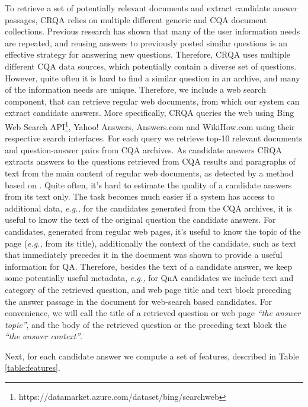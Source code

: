 \documentclass[letterpaper]{article}
\makeatletter
\newcommand{\eg}{\textit{e.g.,}\@\xspace}
\makeatother
\begin{document}
To retrieve a set of potentially relevant documents and extract candidate answer passages, CRQA relies on multiple different generic and CQA document collections.
Previous research \cite{shtok2012learning} has shown that many of the user information needs are repeated, and reusing answers to previously posted similar questions is an effective strategy for answering new questions.
Therefore, CRQA uses multiple different CQA data sources, which potentially contain a diverse set of questions.
However, quite often it is hard to find a similar question in an archive, and many of the information needs are unique.
Therefore, we include a web search component, that can retrieve regular web documents, from which our system can extract candidate answers.
More specifically, CRQA queries the web using Bing Web Search API\footnote{https://datamarket.azure.com/dataset/bing/searchweb}, Yahoo! Answers, Answers.com and WikiHow.com using their respective search interfaces.
For each query we retrieve top-10 relevant documents and question-answer pairs from CQA archives.
As candidate answers CRQA extracts answers to the questions retrieved from CQA results and paragraphs of text from the main content of regular web documents, as detected by a method based on \cite{Kohlschutter_2010}.
Quite often, it's hard to estimate the quality of a candidate answers from its text only.
The task becomes much easier if a system has access to additional data, \eg for the candidates generated from the CQA archives, it is useful to know the text of the original question the candidate answers.
For candidates, generated from regular web pages, it's useful to know the topic of the page (\eg from its title), additionally the context of the candidate, such as text that immediately precedes it in the document was shown to provide a useful information for QA.
Therefore, besides the text of a candidate answer, we keep some potentially useful metadata, \eg for QnA candidates we include text and category of the retrieved question, and web page title and text block preceding the answer passage in the document for web-search based candidates.
For convenience, we will call the title of a retrieved question or web page \textit{``the answer topic''}, and the body of the retrieved question or the preceding text block the \textit{``the answer context''}.

Next, for each candidate answer we compute a set of features, described in Table \ref{table:features}.
\end{document}
